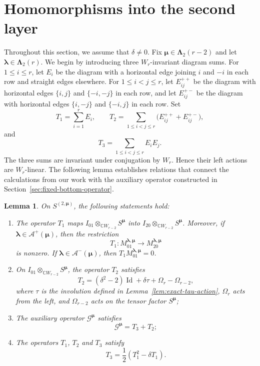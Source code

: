 \documentclass[10pt,a4paper]{amsart}
\newtheorem{lemma}[theorem]{Lemma}
\newcommand{\C}{\mathbb{C}}
\newcommand{\1}{\mathfrak{1}}
\begin{document}
\section{Homomorphisms into the second layer}

Throughout this section, we assume that $\delta\neq0$. Fix $\bm\mu\in\bm\Lambda_2(r-2)$ and let $\bm\lambda\in\bm\Lambda_2(r)$. We begin by introducing three $W_r$-invariant diagram sums. For $1\leq i\leq r$, let $E_i$ be the diagram with a horizontal edge joining $i$ and $-i$ in each row and straight edges elsewhere. For $1\leq i<j\leq r$, let $E_{ij}^{++}$ be the diagram with horizontal edges $\{i,j\}$ and $\{-i,-j\}$ in each row, and let $E_{ij}^{+-}$ be the diagram with horizontal edges $\{i,-j\}$ and $\{-i,j\}$ in each row. Set
$$
T_1=\sum_{i=1}^r E_i, \qquad T_2=\sum_{1\leq i<j\leq r}\bigl(E_{ij}^{++}+E_{ij}^{+-}\bigr),
$$
and
$$
T_3=\sum_{1\leq i<j\leq r}E_iE_j. 
$$
The three sums are invariant under conjugation by $W_r$. Hence their left actions are $W_r$-linear. The following lemma establishes relations that connect the calculations from our work \cite{KCTprevious} with the auxiliary operator constructed in Section~\ref{sec:fixed-bottom-operator}.

\begin{lemma}\label{lem:exact-second-layer-actions}
On $S^{(2,\bm\mu)}$, the following statements hold:
\begin{enumerate}
\item The operator $T_1$ maps $I_{01}\otimes_{\C W_{r-2}} S^{\bm\mu}$ into
$I_{20}\otimes_{\C W_{r-2}} S^{\bm\mu}$. Moreover, if
$\bm\lambda\in\mathcal A^+(\bm\mu)$, then the restriction
$$
T_1:M_{01}^{\bm\lambda,\bm\mu}
\longrightarrow M_{20}^{\bm\lambda,\bm\mu}
$$
is nonzero. If $\bm\lambda\in\mathcal A^-(\bm\mu)$, then $T_1M_{01}^{\bm\lambda,\bm\mu}=0$.
\item On $I_{01}\otimes_{\C W_{r-2}} S^{\bm\mu}$, the operator $T_2$ satisfies 
$$T_2=(\delta^2-2)\operatorname{Id}+\delta\tau+\Omega_r-\Omega_{r-2},$$
where $\tau$ is the involution defined in Lemma~\ref{lem:exact-tau-action}, $\Omega_r$ acts from the left, and $\Omega_{r-2}$ acts on the tensor factor $S^{\bm\mu}$;
\item The auxiliary operator $\mathcal G^{\bm\mu}$ satisfies 
$$\mathcal G^{\bm\mu}=T_3+T_2;$$
\item The operators $T_1$, $T_2$ and $T_3$ satisfy $$T_3=\frac12(T_1^2-\delta T_1).$$
\end{enumerate}
\end{lemma}
\end{document}

